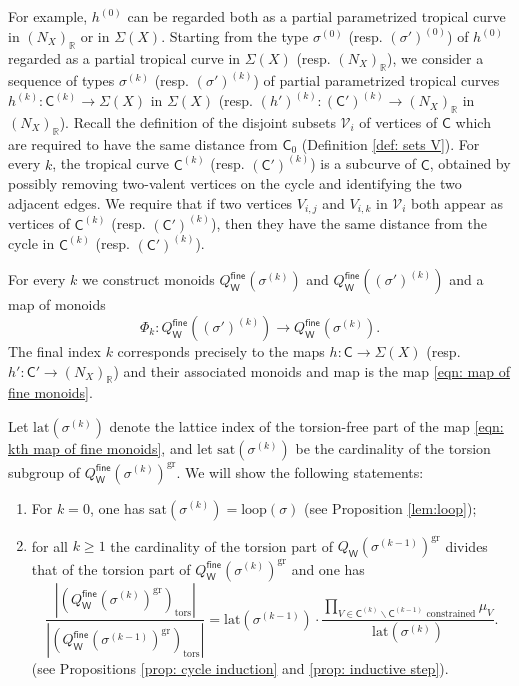 \documentclass{article}
\def\cV{\mathcal{V}}
\def\R{\mathbb{R}}
\newcommand{\tropC}{\mathsf{C}}
\newcommand{\gr}{\mathrm{gr}}
\newcommand{\tors}{\mathrm{tors}}
\newcommand{\fine}{\mathsf{fine}}
\newcommand{\W}{\mathsf{W}}
\begin{document}
For example, $h^{(0)}$ can be regarded both as a partial parametrized tropical curve in $(N_X)_{\mathbb{R}}$ or in $\Sigma(X)$.
Starting from the type $\sigma^{(0)}$ (resp. $(\sigma')^{(0)}$) of $h^{(0)}$ regarded as a partial tropical curve in $\Sigma(X)$ (resp. $(N_X)_\R$), we consider a sequence of types $\sigma^{(k)}$ (resp. $(\sigma')^{(k)}$) of partial parametrized tropical curves $h^{(k)}: \tropC^{(k)} \to \Sigma(X)$ in $\Sigma(X)$ (resp. $(h')^{(k)}: (\tropC')^{(k)} \to (N_X)_\mathbb{R}$ in $(N_X)_\mathbb{R}$). Recall the definition of the disjoint subsets $\cV_i$ of vertices of $\tropC$ which are required to have the same distance from $\tropC_0$ (Definition \ref{def: sets V}). For every $k$, the tropical curve $\tropC^{(k)}$ (resp. $(\mathsf{C}')^{(k)}$) is a subcurve of $\tropC$, obtained by possibly removing two-valent vertices on the cycle and identifying the two adjacent edges. We require that if two vertices $V_{i,j}$ and $V_{i,k}$ in $\mathcal{V}_i$ both appear as vertices of $\tropC^{(k)}$ (resp. $(\tropC')^{(k)}$), then they have the same distance from the cycle in $\tropC^{(k)}$ (resp. $(\tropC')^{(k)}$).


For every $k$ we construct monoids $Q^\fine_\W(\sigma^{(k)})$ and $Q^\fine_\W((\sigma')^{(k)})$ and a map of monoids 
\begin{equation}\label{eqn: kth map of fine monoids}
\Phi_k: Q^\fine_\W((\sigma')^{(k)}) \to Q^\fine_\W(\sigma^{(k)}).
\end{equation}
The final index $k$ corresponds precisely to the maps $h: \tropC \to \Sigma(X)$ (resp. $h': \tropC' \to (N_X)_\mathbb{R}$) and their associated monoids and map is the map \eqref{eqn: map of fine monoids}. 

Let $\mathrm{lat}(\sigma^{(k)})$ denote the lattice index of the torsion-free part of the map \eqref{eqn: kth map of fine monoids}, and let $\mathrm{sat}(\sigma^{(k)})$ be the cardinality of the torsion subgroup of $Q^\fine_\W(\sigma^{(k)})^{\gr}$. We will show the following  statements:


\begin{enumerate}[label=(\arabic*)]
    \item For $k=0$, one has $\mathrm{sat}(\sigma^{(k)})=\mathrm{loop}(\sigma)$ (see Proposition \ref{lem:loop});
    \item for all $k \geq 1$ the cardinality of the torsion part of $Q_\W(\sigma^{(k-1)})^{\gr}$ divides that of the torsion part of $Q^\fine_\W(\sigma^{(k)})^{\gr}$ and one has 
    $$  \frac{|(Q^\fine_\W(\sigma^{(k)})^{\gr})_{\tors}|}{|(Q^\fine_\W(\sigma^{(k-1)})^{\gr})_{\tors}|} = \mathrm{lat}(\sigma^{(k-1)})  \cdot \frac{\prod_{V \in \tropC^{(k)} \smallsetminus \tropC^{(k-1)} \text{ constrained}} \mu_V}{\mathrm{lat}(\sigma^{(k)})}.
    $$ 
    (see Propositions \ref{prop: cycle induction} and \ref{prop: inductive step}).
\end{enumerate}
\end{document}
